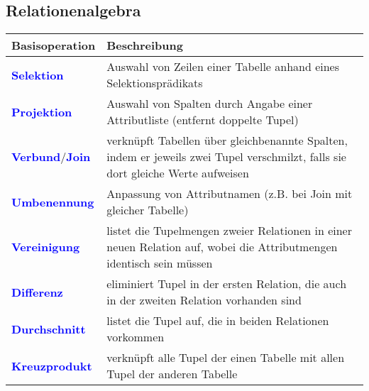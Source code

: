 \documentclass{scrartcl}
\newcommand{\key}[1]{{\textcolor{blue}{\textbf{#1}}}}
\begin{document}
\subsection{Relationenalgebra}

{\renewcommand{\arraystretch}{1.2}
\begin{tabular}{|lp{12.2cm}|}
	\hline
	Basisoperation & Beschreibung \\
	\hline
	\key{Selektion} & Auswahl von Zeilen einer Tabelle anhand eines	Selektionsprädikats \\
	\key{Projektion} & Auswahl von Spalten durch Angabe einer Attributliste (entfernt doppelte Tupel) \\
	\key{Verbund}/\key{Join} & verknüpft Tabellen über gleichbenannte Spalten, indem er jeweils zwei Tupel verschmilzt, falls sie dort gleiche Werte aufweisen \\
	\key{Umbenennung} & Anpassung von Attributnamen (z.B. bei Join mit gleicher Tabelle) \\
	\key{Vereinigung} & listet die Tupelmengen zweier Relationen in einer neuen Relation auf, wobei die Attributmengen identisch sein müssen \\
	\key{Differenz} & eliminiert Tupel in der ersten Relation, die auch in der zweiten Relation vorhanden sind\\
	\key{Durchschnitt} & listet die Tupel auf, die in beiden Relationen vorkommen \\
	\key{Kreuzprodukt} & verknüpft alle Tupel der einen Tabelle mit allen Tupel der anderen Tabelle \\
	\hline
\end{tabular}
}
\vspace{1em}\\
\end{document}
